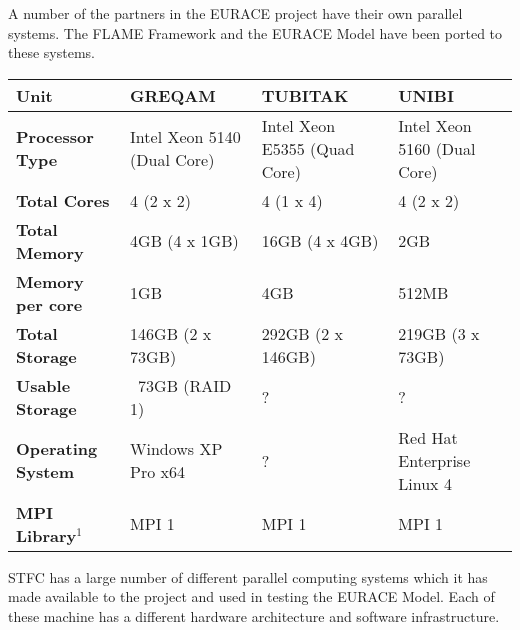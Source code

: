A number of the partners in the EURACE project have their own parallel systems. The FLAME Framework and the EURACE Model have been ported to these systems.
\begin{table}[ht]
\renewcommand{\arraystretch}{1.2}
	\centering
	{\scriptsize
		\begin{tabular}{|l|l|l|l|}\hline
	\bf	Unit &	\bf GREQAM &\bf	 TUBITAK &\bf	 UNIBI\\\hline
\bf Processor Type 	& Intel Xeon 5140 (Dual Core)&	Intel Xeon E5355 (Quad Core) &	Intel Xeon 5160 (Dual Core)\\\hline
\bf Total Cores 	&4 (2 x 2) &	4 (1 x 4) &	4 (2 x 2)\\\hline
\bf Total Memory &	4GB (4 x 1GB) &	16GB (4 x 4GB) &	2GB\\\hline
\bf Memory per core &	1GB &	4GB &	512MB\\\hline
\bf Total Storage &	146GB (2 x 73GB) &	292GB (2 x 146GB) &	219GB (3 x 73GB)\\\hline
\bf Usable Storage &	~73GB (RAID 1) &	 ? &	 ?\\\hline
\bf Operating System &	Windows XP Pro x64 &	 ? &	Red Hat Enterprise Linux 4\\\hline
\bf MPI Library$^1$ 	& MPI 1 &	 MPI 1 &	 MPI 1 \\\hline
			
		\end{tabular}
		}
\end{table}
STFC has a large number of different parallel computing systems which it has made available to the project and used in testing the EURACE Model. Each of these machine has a different hardware architecture and software infrastructure.
